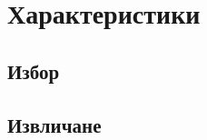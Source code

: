 \documentclass[main.tex]{subfiles}
\begin{document}
\section{Характеристики}
        \subsection{Избор}
        \subsection{Извличане}
\end{document}
